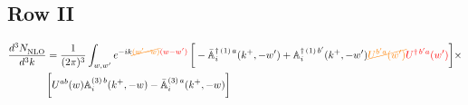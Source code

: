 \documentclass[9pt]{article}
\def\mf#1{\mathbb{#1}}
\numberwithin{equation}{section}
\begin{document}
\subsection{Row II}
\begin{align}
    \frac{d^{3}N_{\rm NLO}^{\rm}}{d^{3}k} &  = \frac{1}{(2\pi)^{3}}  \int_{w, w^\prime} e^{-ik{\color{orange}\cancel{(w^\prime-w)}}{\color{red}(w-w^\prime)}}\,\bigg[-\bar{\mf{A}}^{\dagger\,(1)\,a}_{i}(k^{+},-w^{\prime})+\mf{A}^{\dagger\, (1)\, b^{\prime}}_{i}(k^{+},-w^{\prime}){\color{orange}\cancel{U^{b^{\prime}a}(w^{\prime})}}{\color{red}U^{\dagger\, b^{\prime}a}(w^{\prime})}\bigg]\times \notag \\ & \bigg[U^{ab}(w)\mf{A}^{(3)\, b}_{i}(k^{+},- w)-\Bar{\mf{A}}^{(3)\, a}_{i}(k^{+}, - w)\bigg]\nonumber
\end{align}
\end{document}
